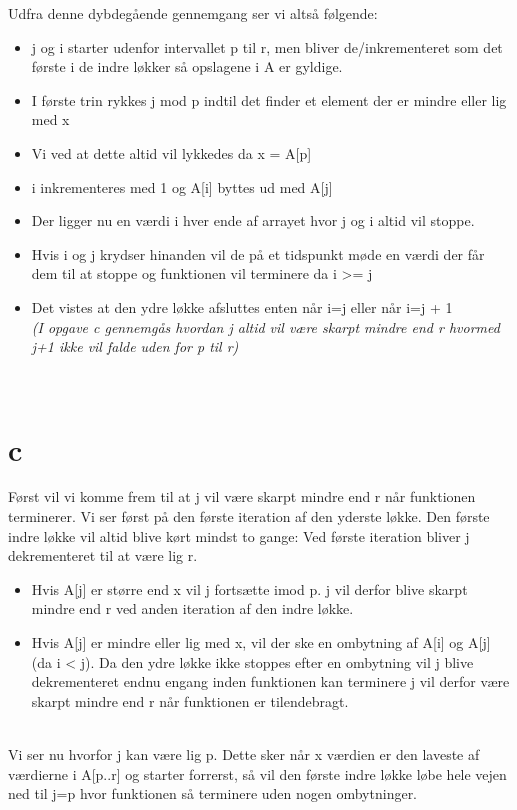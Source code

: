 \documentclass[10pt,a4paper,danish]{article}
\begin{document}
Udfra denne dybdegående gennemgang ser vi altså følgende:
\begin{itemize}
\item j og i starter udenfor intervallet p til r, men bliver de/inkrementeret som det første i de indre løkker så opslagene i A er gyldige.
\item I første trin rykkes j mod p indtil det finder et element der er mindre eller lig med x
\item Vi ved at dette altid vil lykkedes da x = A[p]
\item i inkrementeres med 1 og A[i] byttes ud med A[j]
\item Der ligger nu en værdi i hver ende af arrayet hvor j og i altid vil stoppe.
\item Hvis i og j krydser hinanden vil de på et tidspunkt møde en værdi der får dem til at stoppe og funktionen vil terminere da i >= j
\\

\item Det vistes at den ydre løkke afsluttes enten når i=j eller når i=j + 1\\
\textit{(I opgave c gennemgås hvordan j altid vil være skarpt mindre end r hvormed j+1 ikke vil falde uden for p til r)}
\end{itemize}
\\

\section{c}
Først vil vi komme frem til at j vil være skarpt mindre end r når funktionen terminerer.
Vi ser først på den første iteration af den yderste løkke.
Den første indre løkke vil altid blive kørt mindst to gange: Ved første iteration bliver j dekrementeret til at være lig r. 
\begin{itemize}
\item Hvis A[j] er større end x vil j fortsætte imod p. j vil derfor blive skarpt mindre end r ved anden iteration af den indre løkke.
\item Hvis A[j] er mindre eller lig med x, vil der ske en ombytning af A[i] og A[j] (da i < j). Da den ydre løkke ikke stoppes efter en ombytning vil j blive dekrementeret endnu engang inden funktionen kan terminere j vil derfor være skarpt mindre end r når funktionen er tilendebragt. 
\end{itemize}
\\

Vi ser nu hvorfor j kan være lig p.
Dette sker når x værdien er den laveste af værdierne i A[p..r] og starter forrerst, så vil den første indre løkke løbe hele vejen ned til j=p hvor funktionen så terminere uden nogen ombytninger.
\\
\end{document}
